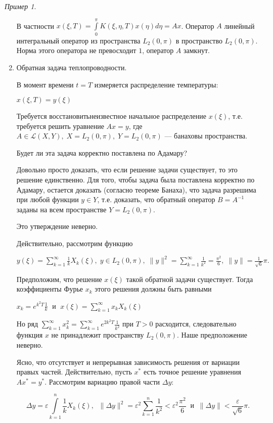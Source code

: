 \documentclass[12pt,a4paper,titlepage, oneside]{book}
\theoremstyle{definition}
\theoremstyle{plain}
\theoremstyle{remark}
\theoremstyle{remark}
\newtheorem*{example}{Пример}
\theoremstyle{remark}
\theoremstyle{remark}
\theoremstyle{plain}
\theoremstyle{plain}
\begin{document}
\begin{example}
\begin{enumerate}
В частности $x(\xi,T) = \displaystyle\int\limits_0^\pi K(\xi, \eta, T) x(\eta)d\eta = Ax$. Оператор $A$ линейный интегральный оператор из пространства $L_2(0, \pi)$ в пространство $L_2(0, \pi)$. Норма этого оператора не превосходит $1$, оператор $A$ замкнут.

	\item Обратная задача теплопроводности.

В момент времени $t = T$ измеряется  распределение температуры:
\begin{center}
$x(\xi, T) = y(\xi)$
\end{center}

Требуется \guillemotleft восстановить\guillemotright \;неизвестное начальное распределение $x(\xi)$, т.е. требуется решить уравнение $Ax = y$, где $A\in\mathscr{L}(X,Y), \; X = L_{2}(0, \pi), \; Y = L_{2}(0, \pi)$ --- банаховы пространства.

Будет ли эта задача корректно поставлена по Адамару?

Довольно просто доказать, что если решение задачи существует, то это решение единственно. Для того, чтобы задача была поставлена корректно по Адамару, остается доказать (согласно теореме Банаха), что задача разрешима при любой функции $y \in Y$, т.е. доказать, что обратный оператор $B = A^{-1}$ заданы на всем пространстве $Y = L_{2}(0, \pi)$.

Это утверждение неверно.

Действительно, рассмотрим функцию
\begin{center}
$y(\xi)=\displaystyle\sum\limits_{k=1}^{\infty} \frac{1}{k} X_k(\xi) ,  \; y\in L_{2}(0, \pi), \; \|y\|^2 = \sum\limits_{k=1}^{\infty} \frac{1}{k^2} = \frac{\pi^2}{6} ,  \; \|y\| = \frac{1}{\sqrt{6}}\pi \mbox{.}$
\end{center}

Предположим, что решение $x(\xi)$ такой обратной задачи существует. Тогда коэффициенты Фурье $x_k$ этого решения должны быть равными
\begin{center}
$x_k=e^{k^2 T} \frac{1}{k} \; \mbox{ и } \; x(\xi) = \displaystyle\sum\limits_{k=1}^{\infty} x_k X_k(\xi)$
\end{center}

Но ряд $\displaystyle\sum\limits_{k=1}^{\infty} x_k^2 = \sum\limits_{k=1}^{\infty} e^{2k^2 T} \frac{1}{k^2}$ при $T > 0$ расходится, следовательно функция $x$ не принадлежит пространству $L_2(0,\pi)$. Наше предположение неверно.

Ясно, что отсутствует и непрерывная зависимость решения от вариации правых частей. Действительно, пусть $x^{*}$ есть точное решение уравнения $Ax^*=y^*$. Рассмотрим вариацию правой части  $\Delta y$:
\begin{center}
$$\Delta y = \varepsilon \int\limits_{k=1}^{n} \frac{1}{k} X_k(\xi) , \; \; \| \Delta y\|^2 = \varepsilon ^2 \sum\limits_{k=1}^{n} \frac{1}{k^2} < \varepsilon^2 \frac{\pi ^2}{6} \; \; \mbox{и} \; \; \| \Delta y \| < \frac{\varepsilon}{\sqrt{6}}\pi.$$
\end{center}


\end{enumerate}
\end{example}
\end{document}
